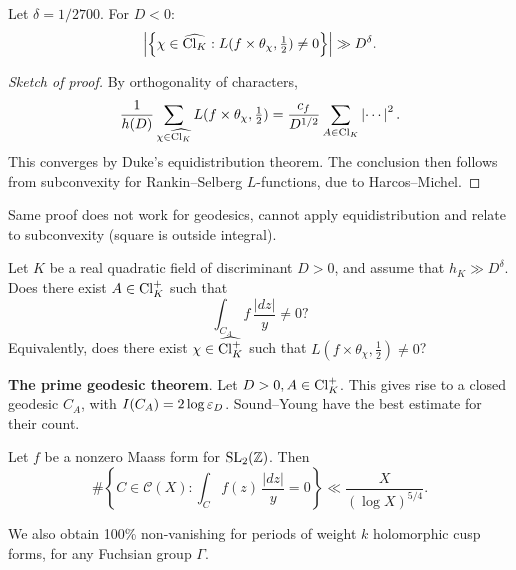 \documentclass[reqno]{amsart} 
\begin{document}
\begin{theorem}
  Let $\delta = 1/2700$.  For $D < 0$:
  \begin{equation*}
    \left| \left\{ \chi \in \widehat{\operatorname{Cl}_K} : L(f \times \theta_\chi, \tfrac{1}{2}) \neq 0 \right\} \right|
    \gg D^\delta.
  \end{equation*}
\end{theorem}
\begin{proof}[Sketch of proof]
  By orthogonality of characters,
  \begin{equation*}
    \frac{1}{h(D)}
    \sum_{\chi \in \widehat{\operatorname{Cl}_K}}
    L(f \times \theta_\chi, \tfrac{1}{2})
    = \frac{c_f}{ D^{1/2}}
    \sum_{A \in \operatorname{Cl}_K} \left| \dotsb \right|^2.
  \end{equation*}
  This converges by Duke's equidistribution theorem.  The conclusion then follows from subconvexity for Rankin--Selberg $L$-functions, due to Harcos--Michel.
\end{proof}

Same proof does not work for geodesics, cannot apply equidistribution and relate to subconvexity (square is outside integral).

\begin{question}
  Let $K$ be a real quadratic field of discriminant $D > 0$, and assume that $h_K  \gg D^\delta$.  Does there exist $A \in \operatorname{Cl}_K^+$ such that
  \begin{equation*}
    \int_{C_A} f \, \frac{\lvert d z \rvert}{y} \neq 0?
  \end{equation*}
  Equivalently, does there exist $\chi \in \widehat{\operatorname{Cl}_K^+}$ such that $L(f \times \theta_\chi, \tfrac{1}{2}) \neq 0$?
\end{question}

\textbf{The prime geodesic theorem}.  Let $D > 0, A \in \operatorname{Cl}_K^+$.  This gives rise to a closed geodesic $C_A$, with $I(C_A) = 2 \log \varepsilon_D$.  Sound--Young have the best estimate for their count.

\begin{theorem}[C--Nordentoft 2024]
  Let $f$ be a nonzero Maass form for $\operatorname{SL}_2(\mathbb{Z})$.  Then
  \begin{equation*}
    \# \left\{ C \in \mathcal{C}(X) :
      \int_{C}
      f(z)
      \, \frac{\lvert d z \rvert}{y} =  0\right\}
    \ll
    \frac{X}{(\log X)^{5/4}}.
  \end{equation*}
\end{theorem}

\begin{remark}
  We also obtain 100\% non-vanishing for periods of weight $k$ holomorphic cusp forms, for any Fuchsian group $\Gamma$.
\end{remark}
\end{document}

